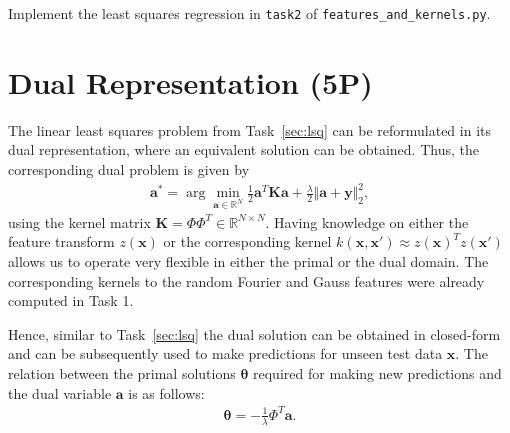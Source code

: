 \documentclass{article}
\renewcommand{\vec}[1]{\textbf{#1}}
\renewcommand{\vec}[1]{\textbf{#1}}
\begin{document}
Implement the least squares regression in \texttt{task2} of \texttt{features\_and\_kernels.py}.

\section{Dual Representation (5P)}
The linear least squares problem from Task~\ref{sec:lsq} can be reformulated in its dual representation, where an equivalent solution can be obtained. 
Thus, the corresponding dual problem is given by
\begin{eqnarray} \label{eq:dual}
\bm a^* = \arg \min_{\bm a \in \mathbb{R}^N} \frac 1 2 \bm a^T \mathbf K \bm a +\frac \lambda 2 \Vert \bm a + \bm y \Vert_2^2,
\end{eqnarray} 
using the kernel matrix $\mathbf K = \Phi \Phi^T \in \mathbb{R}^{N\times N}$.
Having knowledge on either the feature transform $z(\vec x)$ or the corresponding kernel $k(\vec x,\vec x') \approx z(\vec x)^T z(\vec x')$ allows us to operate very flexible in either the primal or the dual domain. The corresponding kernels to the random Fourier and Gauss features were already computed in Task 1. 

Hence, similar to Task~\ref{sec:lsq} the dual solution can be obtained in closed-form and can be subsequently used to make predictions for unseen test data $\vec x$.
The relation between the primal solutions $\bm \theta$ required for making new predictions and the dual variable $\vec a$ is as follows:
\begin{eqnarray} \label{eq:rel_primal_dual}
\bm \theta = -\frac 1 \lambda \Phi^T \bm a.
\end{eqnarray}
\end{document}
